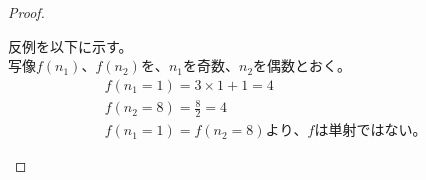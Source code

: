 \documentclass[dvipdfmx,uplatex]{jsarticle}
\begin{document}
\newpage
{}
\begin{proof}
  \begin{flushleft}
    反例を以下に示す。\\
    写像$f({n}_{1})、f({n}_{2})$を、${n}_{1}$を奇数、${n}_{2}$を偶数とおく。\\
    \begin{equation}
      \begin{aligned}
        &f({n}_{1}=1) = 3 \times 1+1 = 4\nonumber\\
        &f({n}_{2}=8) = \frac{8}{2} = 4\nonumber\\
        &f({n}_{1}=1) = f({n}_{2}=8) より、fは単射ではない。
      \end{aligned}
    \end{equation}
  \end{flushleft}
\end{proof}
\end{document}
